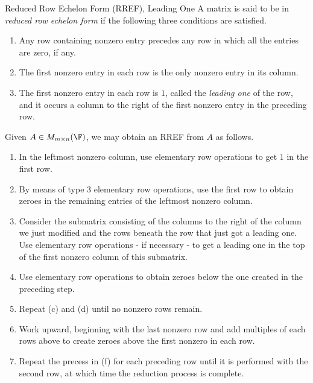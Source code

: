 \documentclass[linearalgebra]{subfiles}
\begin{document}
    \begin{definition}{Reduced Row Echelon Form (RREF), Leading One}{}
            A matrix is said to be in \emph{reduced row echelon form} if the following three conditions are satisfied.
            \begin{enumerate}
                \item Any row containing nonzero entry precedes any row in which all the entries are zero, if any.
                \item The first nonzero entry in each row is the only nonzero entry in its column.
                \item The first nonzero entry in each row is $1$, called the \emph{leading one} of the row, and it occurs a column to the right of the first nonzero entry in the preceding row.
            \end{enumerate}
    \end{definition}

    \begin{remark}
        Given $A\in M_{m\times n}(\F)$, we may obtain an RREF from $A$ as follows. 
        \begin{enumerate}
            \item In the leftmost nonzero column, use elementary row operations to get $1$ in the first row.
            \item By means of type 3 elementary row operations, use the first row to obtain zeroes in the remaining entries of the leftmost nonzero column.
            \item Consider the submatrix consisting of the columns to the right of the column we just modified and the rows beneath the row that just got a leading one. Use elementary row operations - if necessary - to get a leading one in the top of the first nonzero column of this submatrix.
            \item Use elementary row operations to obtain zeroes below the one created in the preceding step.
            \item Repeat (c) and (d) until no nonzero rows remain.
            \item Work upward, beginning with the last nonzero row and add multiples of each rows above to create zeroes above the first nonzero in each row.
            \item Repeat the precess in (f) for each preceding row until it is performed with the second row, at which time the reduction process is complete.
        \end{enumerate}
    \end{remark}
\end{document}
